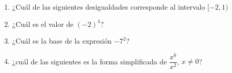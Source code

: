 \documentclass[fleqn]{article}
\begin{document}
\begin{enumerate}
\begin{enumerate}
  \end{enumerate}
  \item ¿Cuál de las siguientes desigualdades corresponde al intervalo $[-2,1)$
  \begin{enumerate}
  \end{enumerate}
  \item ¿Cuál es el valor de $(-2)^{4}$?
  \begin{enumerate}
  \end{enumerate}
  \item ¿Cuál es la base de la expresión $-7^{2}$?
  \begin{enumerate}
  \end{enumerate}
  \item ¿cuál de las siguientes es la forma simplificada de $\dfrac{x^{6}}{x^{2}}$, $x\neq 0$?
  \begin{enumerate}
  \end{enumerate}
\end{enumerate}
\end{document}
